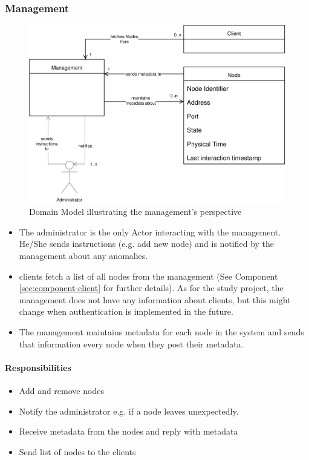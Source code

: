 \subsubsection{Management}\label{sec:component-management}

\begin{figure}[h]
    \centering
    \includegraphics[width=0.75\linewidth]{resources/management_domain_model}
    \caption[Management Domain Model]{Domain Model illustrating the \gls{management}'s perspective}
\end{figure}
\begin{itemize}
    \item The \gls{administrator} is the only Actor interacting with the \gls{management}. He/She sends instructions (e.g. add new \gls{node}) and is notified by the \gls{management} about any anomalies.
    \item \glspl{client} fetch a list of all \glspl{node} from the \gls{management} (See Component \ref{sec:component-client}  for further details). As for the study project, the \gls{management} does not have any information about \glspl{client}, but this might change when authentication is implemented in the future.
    \item The \gls{management} maintains \gls{metadata} for each \gls{node} in the \gls{system} and sends that information every \gls{node} when they post their \gls{metadata}.
\end{itemize}

\paragraph{Responsibilities}
\begin{itemize}
    \item Add and remove \glspl{node}
    \item Notify the \gls{administrator} e.g. if a \gls{node} leaves unexpectedly.
    \item Receive \gls{metadata} from the \glspl{node} and reply with \gls{metadata}
    \item Send list of \glspl{node} to the \glspl{client}
\end{itemize}

